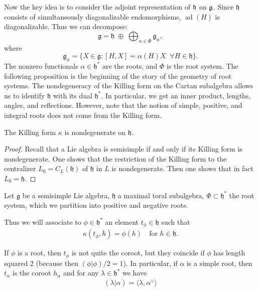 \documentclass[12pt]{article}
\begin{document}
Now the key idea is to consider the adjoint representation of $\mathfrak{h}$ on $\mathfrak{g}$. Since $\mathfrak{h}$ consists of simultaneously diagonalizable endomorphisms, $\operatorname{ad}(H)$ is diagonalizable. Thus we can decompose:
\[
    \mathfrak{g} = \mathfrak{h} \;\oplus\; \bigoplus_{\alpha \in \Phi} \mathfrak{g}_\alpha,
\]
where
\[
    \mathfrak{g}_\alpha = \{ X \in \mathfrak{g} : [H,X] = \alpha(H) X \;\;\forall H\in \mathfrak{h}\}.
\]
The nonzero functionals $\alpha \in \mathfrak{h}^*$ are the roots, and $\Phi$ is the root system. The following proposition is the beginning of the story of the geometry of root systems. The nondegeneracy of the Killing form on the Cartan subalgebra allows us to identify $\mathfrak{h}$ with its dual $\mathfrak{h}^*$. In particular, we get an inner product, lengths, angles, and reflections. However, note that the notion of simple, positive, and integral roots does not come from the Killing form.

\begin{proposition}[Humphreys 8.2]
    The Killing form $\kappa$ is nondegenerate on $\mathfrak{h}$.
\end{proposition}

\begin{proof}

    Recall that a Lie algebra is semisimple if and only if its Killing form is nondegenerate. One shows that the restriction of the Killing form to the centralizer $L_0 = C_L(\mathfrak{h})$ of $\mathfrak{h}$ in $L$ is nondegenerate. Then one shows that in fact $L_0 = \mathfrak{h}$.
\end{proof}

Let $\mathfrak{g}$ be a semisimple Lie algebra, $\mathfrak{h}$ a maximal toral subalgebra, $\Phi \subset \mathfrak{h}^*$ the root system, which we partition into positive and negative roots.

Thus we will associate to $\phi \in \mathfrak{h}^*$ an element $t_\phi \in \mathfrak{h}$ such that
\begin{align*}
    \kappa(t_\phi, h) = \phi(h) \quad \text{for } h \in \mathfrak{h}.
\end{align*}
\begin{remark}
    If $\phi$ is a root, then $t_\phi$ is not quite the coroot, but they coincide if $\phi$ has length squared $2$ (because then $(\phi|\phi)/2 = 1$). In particular, if $\alpha$ is a simple root, then $t_\alpha$ is the coroot $h_\alpha$ and for any $\lambda \in \mathfrak{h}^*$ we have
    \begin{align*}
        (\lambda|\alpha) = \langle \lambda, \alpha^\vee \rangle
    \end{align*}
\end{remark}
\end{document}
